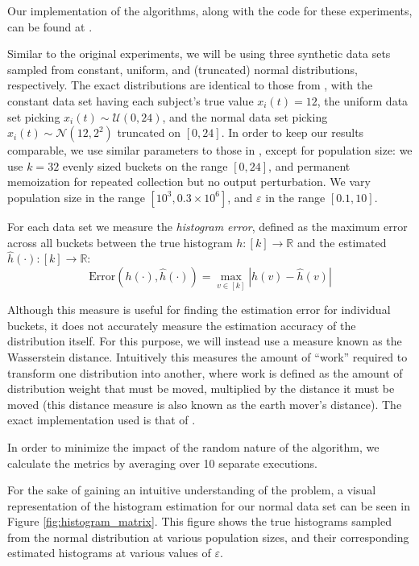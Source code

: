 \documentclass[a4paper,12pt]{article}
\newcommand{\fancy}{\mathcal}
\renewcommand{\epsilon}{\varepsilon}
\begin{document}
Our implementation of the algorithms, along with the code for these experiments, can be found at \cite{git_repo}.

Similar to the original experiments, we will be using three synthetic data sets sampled from constant, uniform, and (truncated) normal distributions, respectively. The exact distributions are identical to those from \cite{microsoft_telemetry}, with the constant data set having each subject's true value $x_i(t)=12$, the uniform data set picking $x_i(t) \sim \fancy{U}(0,24)$, and the normal data set picking $x_i(t) \sim \fancy{N}(12, 2^2)$ truncated on $[0,24]$. In order to keep our results comparable, we use similar parameters to those in \cite{microsoft_telemetry}, except for population size: we use $k=32$ evenly sized buckets on the range $[0,24]$, and permanent memoization for repeated collection but no output perturbation. We vary population size in the range $[10^3, 0.3 \times 10^6]$, and $\epsilon$ in the range $[0.1, 10]$.

For each data set we measure the \emph{histogram error}, defined as the maximum error across all buckets between the true histogram $h : [k] \to \mathbb{R}$ and the estimated $\hat{h}(\cdot) : [k] \to \mathbb{R}$:
\begin{equation*}
    \text{Error}\left(h(\cdot), \hat{h}(\cdot)\right) = \max_{v\in [k]} |h(v) - \hat{h}(v)|
\end{equation*}

Although this measure is useful for finding the estimation error for individual buckets, it does not accurately measure the estimation accuracy of the distribution itself. For this purpose, we will instead use a measure known as the Wasserstein distance. Intuitively this measures the amount of ``work'' required to transform one distribution into another, where work is defined as the amount of distribution weight that must be moved, multiplied by the distance it must be moved (this distance measure is also known as the earth mover's distance). The exact implementation used is that of \cite{scipy_wasserstein}.

In order to minimize the impact of the random nature of the algorithm, we calculate the metrics by averaging over 10 separate executions.

For the sake of gaining an intuitive understanding of the problem, a visual representation of the histogram estimation for our normal data set can be seen in Figure \ref{fig:histogram_matrix}. This figure shows the true histograms sampled from the normal distribution at various population sizes, and their corresponding estimated histograms at various values of $\epsilon$. 
\end{document}
